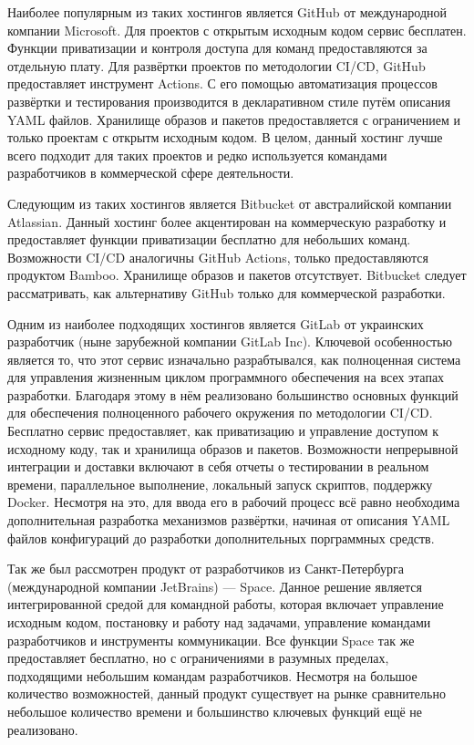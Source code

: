 Наиболее популярным из таких хостингов является GitHub от международной компании Microsoft.
Для проектов с открытым исходным кодом сервис бесплатен.
Функции приватизации и контроля доступа для команд предоставляются за отдельную плату.
Для развёртки проектов по методологии CI/CD, GitHub предоставляет инструмент Actions.
С его помощью автоматизация процессов развёртки и тестирования производится в декларативном стиле путём описания YAML файлов.
Хранилище образов и пакетов предоставляется с ограничением и только проектам с открытм исходным кодом.
В целом, данный хостинг лучше всего подходит для таких проектов и редко используется командами разработчиков в коммерческой сфере деятельности.

Следующим из таких хостингов является Bitbucket от австралийской компании Atlassian.
Данный хостинг более акцентирован на коммерческую разработку и предоставляет функции приватизации бесплатно для небольших команд.
Возможности CI/CD аналогичны GitHub Actions, только предоставляются продуктом Bamboo.
Хранилище образов и пакетов отсутствует.
Bitbucket следует рассматривать, как альтернативу GitHub только для коммерческой разработки.

Одним из наиболее подходящих хостингов является GitLab от украинских разработчик (ныне зарубежной компании GitLab Inc).
Ключевой особенностью является то, что этот сервис изначально разрабтывался,
как полноценная система для управления жизненным циклом программного обеспечения на всех этапах разработки.
Благодаря этому в нём реализовано большинство основных функций для обеспечения полноценного рабочего окружения по методологии CI/CD.
Бесплатно сервис предоставляет, как приватизацию и управление доступом к исходному коду, так и хранилища образов и пакетов.
Возможности непрерывной интеграции и доставки включают в себя отчеты о тестировании в реальном времени, параллельное выполнение, локальный запуск скриптов, поддержку Docker.
Несмотря на это, для ввода его в рабочий процесс всё равно необходима дополнительная разработка механизмов развёртки,
начиная от описания YAML файлов конфигураций до разработки дополнительных порграммных средств.

Так же был рассмотрен продукт от разработчиков из Санкт-Петербурга (международной компании JetBrains) --- Space.
Данное решение является интегрированной средой для командной работы, которая включает управление исходным кодом, постановку и работу над задачами, управление командами разработчиков и инструменты коммуникации.
Все функции Space так же предоставляет бесплатно, но с ограничениями в разумных пределах, подходящими небольшим командам разработчиков.
Несмотря на большое количество возможностей, данный продукт существует на рынке сравнительно небольшое количество времени и большинство ключевых функций ещё не реализовано.

